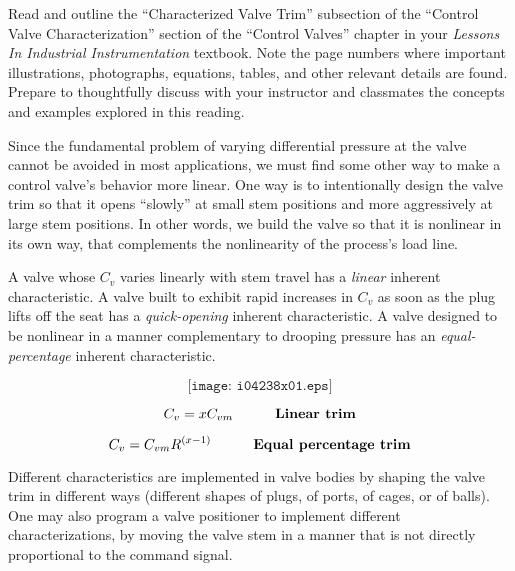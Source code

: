 

Read and outline the ``Characterized Valve Trim'' subsection of the ``Control Valve Characterization'' section of the ``Control Valves'' chapter in your {\it Lessons In Industrial Instrumentation} textbook.  Note the page numbers where important illustrations, photographs, equations, tables, and other relevant details are found.  Prepare to thoughtfully discuss with your instructor and classmates the concepts and examples explored in this reading.














Since the fundamental problem of varying differential pressure at the valve cannot be avoided in most applications, we must find some other way to make a control valve's behavior more linear.  One way is to intentionally design the valve trim so that it opens ``slowly'' at small stem positions and more aggressively at large stem positions.  In other words, we build the valve so that it is nonlinear in its own way, that complements the nonlinearity of the process's load line.

\vskip 10pt

A valve whose $C_v$ varies linearly with stem travel has a {\it linear} inherent characteristic.  A valve built to exhibit rapid increases in $C_v$ as soon as the plug lifts off the seat has a {\it quick-opening} inherent characteristic.  A valve designed to be nonlinear in a manner complementary to drooping pressure has an {\it equal-percentage} inherent characteristic.

$$\texttt{[image: i04238x01.eps]}$$

$$C_v = x C_{vm} \hskip 30pt \hbox{\bf Linear trim}$$

$$C_v = C_{vm} R^{(x - 1)}  \hskip 30pt \hbox{\bf Equal percentage trim}$$

Different characteristics are implemented in valve bodies by shaping the valve trim in different ways (different shapes of plugs, of ports, of cages, or of balls).  One may also program a valve positioner to implement different characterizations, by moving the valve stem in a manner that is not directly proportional to the command signal.






